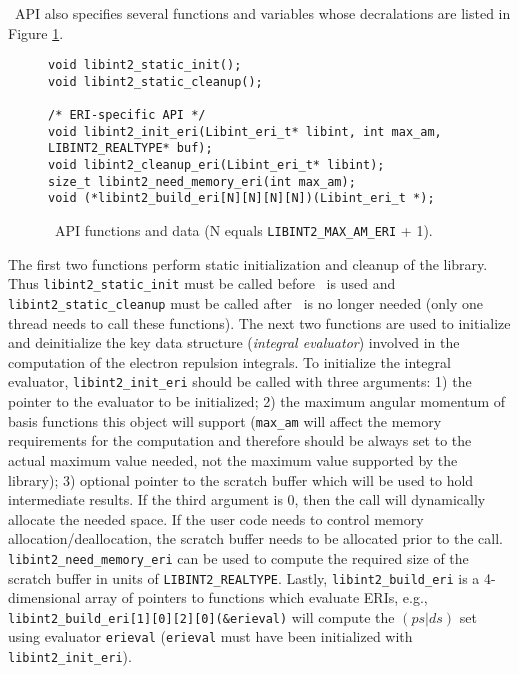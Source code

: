 \documentclass[12pt]{article}
\begin{document}
\LIBINT\ API also specifies several functions and variables whose decralations are listed in Figure \ref{fig:api}.
\begin{figure}
\caption{\label{fig:api} \LIBINT\ API  functions and data (N equals {\tt LIBINT2\_MAX\_AM\_ERI} + 1). }
\begin{center}
\begin{minipage}[t]{0.9\linewidth}
\begin{verbatim}
void libint2_static_init();
void libint2_static_cleanup();

/* ERI-specific API */
void libint2_init_eri(Libint_eri_t* libint, int max_am, LIBINT2_REALTYPE* buf);
void libint2_cleanup_eri(Libint_eri_t* libint);
size_t libint2_need_memory_eri(int max_am);
void (*libint2_build_eri[N][N][N][N])(Libint_eri_t *);
\end{verbatim}
\end{minipage}
\end{center}
\end{figure}
The first two functions perform static initialization and cleanup of the library.
Thus {\tt libint2\_static\_init} must be called before \LIBINT\ is used and
{\tt libint2\_static\_cleanup} must be called after \LIBINT\ is no longer needed (only one thread needs to call these functions).
The next two functions are used to initialize and deinitialize the key data
structure ({\em integral evaluator}) involved in the computation of the electron repulsion integrals.
To initialize the integral evaluator, {\tt libint2\_init\_eri} should be called with three arguments:
1) the pointer to the evaluator to be initialized; 2) the maximum angular momentum
of basis functions this object will support ({\tt max\_am} will affect the memory requirements
for the computation and therefore should be always set to the actual maximum value needed,
not the maximum value supported by the library); 3) optional pointer to the scratch buffer
which will be used to hold intermediate results. If the third argument is 0, then
the call will dynamically allocate the needed space. If the user code needs to control
memory allocation/deallocation, the scratch buffer needs to be allocated prior to the call.
{\tt libint2\_need\_memory\_eri} can be used to compute the required size of
the scratch buffer in units of {\tt LIBINT2\_REALTYPE}. Lastly, {\tt libint2\_build\_eri} is a 4-dimensional
array of pointers to functions which evaluate ERIs, e.g., {\tt libint2\_build\_eri[1][0][2][0](\&erieval)}
will compute the $(ps|ds)$ set using evaluator {\tt erieval} ({\tt erieval} must have been initialized
with {\tt libint2\_init\_eri}).
\end{document}
